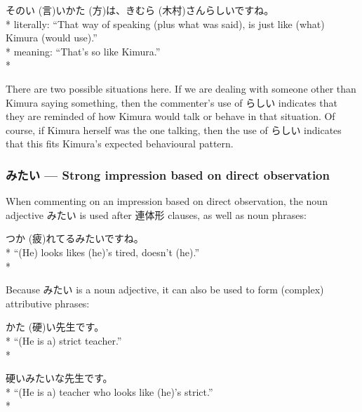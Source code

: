 \documentclass[11pt, b5paper, twoside, openright, onecolumn]{book}
\makeatletter
\newcommand*{\rubystack}[2]{{\relscale{0.5}%
  \begin{tabular}[b]{@{}c@{}}%
    {#1}\\%
   {\textscale{2}{#2}}%
  \end{tabular}}%
}
\DeclareRobustCommand*{\ruby}[2]{%
  \mbox{%
    \setlength{\parskip}{0ex}%
    \BeginAccSupp{method=pdfstringdef,ActualText={#1}}%
      \rubystack{\phantom{#2}}{#1}%
      \llap{%
        \rubystack{#2}{\phantom{#1}}%
      }%
    \EndAccSupp{}%
  }%
}
\renewcommand*{\ruby}[2]{#2 (#1)}%
\newenvironment{exampleblock}{
\setlength{\parindent}{0.6in}
\begin{minipage}[t]{\dimexpr\textwidth-\parindent}}
{\end{minipage}}
\makeatother
\begin{document}
\vspace{0.4cm}
\begin{exampleblock}
その\ruby{言}{い}い\ruby{方}{かた}は、\ruby{木村}{きむら}さんらしいですね。 \\* 
literally: “That way of speaking (plus what was said)‚ is just like (what) Kimura (would use).” \\* 
meaning: “That’s so like Kimura.” \\* 
\end{exampleblock}
\vspace{0.2cm}

There are two possible situations here. If we are dealing with someone other than Kimura saying something‚ then the commenter’s use of らしい indicates that they are reminded of how Kimura would talk or behave in that situation. Of course‚ if Kimura herself was the one talking‚ then the use of らしい indicates that this fits Kimura’s expected behavioural pattern.

\subsubsection{みたい — Strong impression based on direct observation}

When commenting on an impression based on direct observation‚ the noun adjective みたい is used after 連体形 clauses‚ as well as noun phrases:

\vspace{0.4cm}
\begin{exampleblock}
\ruby{疲}{つか}れてるみたいですね。 \\* 
“(He) looks likes (he)’s tired‚ doesn’t (he).” \\* 
\end{exampleblock}
\vspace{0.2cm}

Because みたい is a noun adjective‚ it can also be used to form (complex) attributive phrases:

\vspace{0.4cm}
\begin{exampleblock}
\ruby{硬}{かた}い先生です。 \\* 
“(He is a) strict teacher.” \\* 
\end{exampleblock}
\vspace{0.2cm}

\begin{exampleblock}
硬いみたいな先生です。 \\* 
“(He is a) teacher who looks like (he)’s strict.” \\* 
\end{exampleblock}
\vspace{0.2cm}
\end{document}
